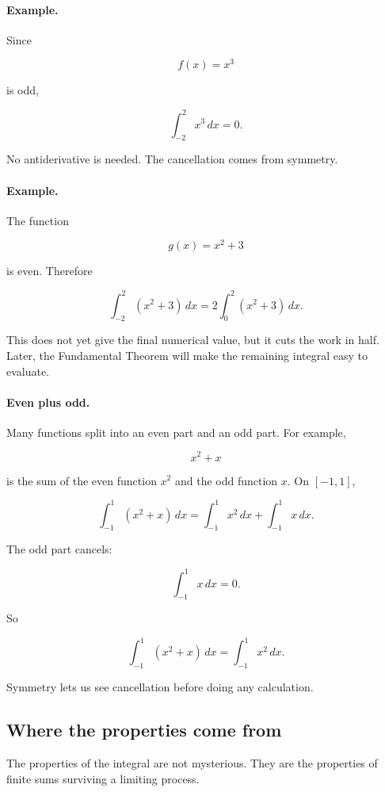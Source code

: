 \paragraph{Example.}
Since

\[
f(x)=x^3
\]

is odd,

\[
\int_{-2}^{2} x^3\,dx=0.
\]

No antiderivative is needed.  The cancellation comes from symmetry.

\paragraph{Example.}
The function

\[
g(x)=x^2+3
\]

is even.  Therefore

\[
\int_{-2}^{2} (x^2+3)\,dx
=
2\int_0^2 (x^2+3)\,dx.
\]

This does not yet give the final numerical value, but it cuts the work in half.  Later, the
Fundamental Theorem will make the remaining integral easy to evaluate.

\paragraph{Even plus odd.}
Many functions split into an even part and an odd part.  For example,

\[
x^2+x
\]

is the sum of the even function \(x^2\) and the odd function \(x\).  On \([-1,1]\),

\[
\int_{-1}^{1} (x^2+x)\,dx
=
\int_{-1}^{1} x^2\,dx+\int_{-1}^{1} x\,dx.
\]

The odd part cancels:

\[
\int_{-1}^{1} x\,dx=0.
\]

So

\[
\int_{-1}^{1} (x^2+x)\,dx
=
\int_{-1}^{1} x^2\,dx.
\]

Symmetry lets us see cancellation before doing any calculation.

\subsection{Where the properties come from}
\label{subsec:where-integral-properties-come-from}

The properties of the integral are not mysterious.  They are the properties of finite sums
surviving a limiting process.

